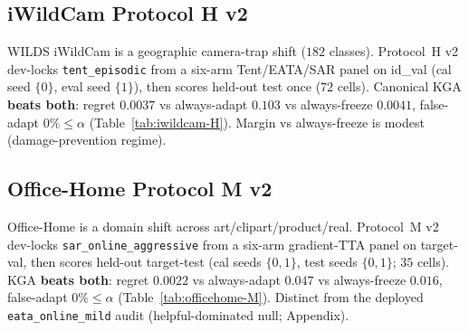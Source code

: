 \documentclass[conference]{IEEEtran}
\theoremstyle{plain}
\theoremstyle{definition}
\theoremstyle{remark}
\begin{document}
\subsection{iWildCam Protocol H v2}
WILDS iWildCam is a geographic camera-trap shift ($182$ classes). Protocol~H v2 dev-locks
\texttt{tent\_episodic} from a six-arm Tent/EATA/SAR panel on id\_val (cal seed $\{0\}$,
eval seed $\{1\}$), then scores held-out test once ($72$ cells). Canonical \textsc{KGA}
\textbf{beats both}: regret $0.0037$ vs always-adapt $0.103$ vs always-freeze $0.0041$,
false-adapt $0\%\le\alpha$ (Table~\ref{tab:iwildcam-H}). Margin vs always-freeze is modest
(damage-prevention regime).

\subsection{Office-Home Protocol M v2}
Office-Home is a domain shift across art/clipart/product/real. Protocol~M v2 dev-locks
\texttt{sar\_online\_aggressive} from a six-arm gradient-TTA panel on target-val, then scores
held-out target-test (cal seeds $\{0,1\}$, test seeds $\{0,1\}$; $35$ cells). \textsc{KGA}
\textbf{beats both}: regret $0.0022$ vs always-adapt $0.047$ vs always-freeze $0.016$,
false-adapt $0\%\le\alpha$ (Table~\ref{tab:officehome-M}). Distinct from the deployed
\texttt{eata\_online\_mild} audit (helpful-dominated null; Appendix).

\begin{table}[t]\centering\small
\caption{iWildCam Protocol~H v2: dev-locked \texttt{tent\_episodic}, held-out test ($n{=}72$).}
\label{tab:iwildcam-H}
\end{table}

\begin{table}[t]\centering\small
\caption{Office-Home Protocol~M v2: dev-locked \texttt{sar\_online\_aggressive}, target-test ($n{=}35$).}
\label{tab:officehome-M}
\end{table}
\end{document}

